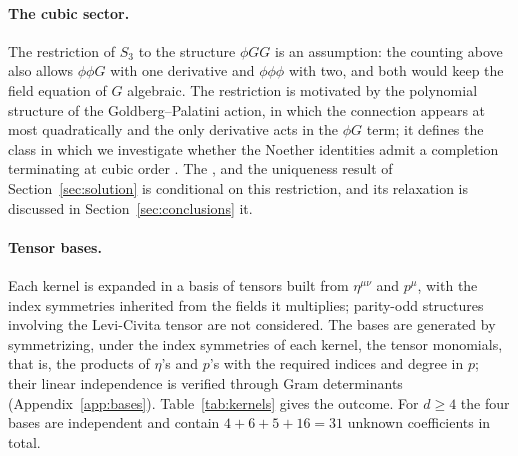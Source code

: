 \documentclass[prd,aps,preprint,superscriptaddress,nofootinbib,amsmath,amssymb,eqsecnum]{revtex4-2}
\providecommand{\DIFaddtex}[1]{{\protect\color{blue} \sf #1}} %
\providecommand{\DIFdeltex}[1]{{\protect\color{red} \scriptsize #1}} %
\providecommand{\DIFaddbegin}{} %
\providecommand{\DIFaddend}{} %
\providecommand{\DIFdelbegin}{} %
\providecommand{\DIFdelend}{} %
\providecommand{\DIFadd}[1]{\texorpdfstring{\DIFaddtex{#1}}{#1}} %
\providecommand{\DIFdel}[1]{\texorpdfstring{\DIFdeltex{#1}}{}} %
\begin{document}
\paragraph{The cubic sector.} The restriction of $S_3$ to the structure $\phi GG$ is an
assumption: the counting above also allows $\phi\phi G$ with one derivative and
$\phi\phi\phi$ with two, and both would keep the field equation of $G$ algebraic. The
restriction is motivated by the polynomial structure of the Goldberg--Palatini action, in
which the connection appears at most quadratically and the only derivative acts in the
$\phi G$ term; it defines the class in which we investigate whether the Noether identities
admit a completion terminating at cubic order\DIFdelbegin \DIFdel{. The }\DIFdelend \DIFaddbegin \DIFadd{, and the }\DIFaddend uniqueness result of
Section~\ref{sec:solution} is conditional on \DIFdelbegin \DIFdel{this restriction, and its relaxation is
discussed in Section~\ref{sec:conclusions}}\DIFdelend \DIFaddbegin \DIFadd{it}\DIFaddend .

\paragraph{Tensor bases.} Each kernel is expanded in a basis of tensors built from
$\eta^{\mu\nu}$ and $p^\mu$, with the index symmetries inherited from the fields it
multiplies; parity-odd structures involving the Levi-Civita tensor are not considered. The
bases are generated by symmetrizing, under the index symmetries of each kernel, the tensor
monomials, that is, the products of $\eta$'s and $p$'s with the required indices and degree
in $p$; their linear independence is verified through Gram determinants
(Appendix~\ref{app:bases}). Table~\ref{tab:kernels} gives the outcome. For $d\geq4$ the
four bases are independent and contain $4+6+5+16=31$ unknown coefficients in total.
\end{document}

